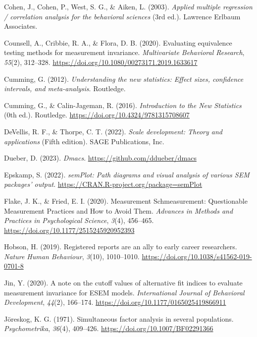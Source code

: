 \documentclass[
  man]{apa7}
\newlength{\cslhangindent}
\newenvironment{CSLReferences}[2] %
 {\begin{list}{}{%
  \setlength{\itemindent}{0pt}
  \setlength{\leftmargin}{0pt}
  \setlength{\parsep}{0pt}
  \ifodd #1
   \setlength{\leftmargin}{\cslhangindent}
   \setlength{\itemindent}{-1\cslhangindent}
  \fi
  \setlength{\itemsep}{#2\baselineskip}}}
 {\end{list}}
\begin{document}
\begin{CSLReferences}{1}{0}
Cohen, J., Cohen, P., West, S. G., \& Aiken, L. (2003). \emph{Applied multiple regression / correlation analysis for the behavioral sciences} (3rd ed.). Lawrence Erlbaum Associates.

Counsell, A., Cribbie, R. A., \& Flora, D. B. (2020). Evaluating equivalence testing methods for measurement invariance. \emph{Multivariate Behavioral Research}, \emph{55}(2), 312--328. \url{https://doi.org/10.1080/00273171.2019.1633617}

Cumming, G. (2012). \emph{Understanding the new statistics: Effect sizes, confidence intervals, and meta-analysis}. Routledge.

Cumming, G., \& Calin-Jageman, R. (2016). \emph{Introduction to the New Statistics} (0th ed.). Routledge. \url{https://doi.org/10.4324/9781315708607}

DeVellis, R. F., \& Thorpe, C. T. (2022). \emph{Scale development: Theory and applications} (Fifth edition). SAGE Publications, Inc.

Dueber, D. (2023). \emph{Dmacs}. \url{https://github.com/ddueber/dmacs}

Epskamp, S. (2022). \emph{semPlot: Path diagrams and visual analysis of various SEM packages' output}. \url{https://CRAN.R-project.org/package=semPlot}

Flake, J. K., \& Fried, E. I. (2020). Measurement Schmeasurement: Questionable Measurement Practices and How to Avoid Them. \emph{Advances in Methods and Practices in Psychological Science}, \emph{3}(4), 456--465. \url{https://doi.org/10.1177/2515245920952393}

Hobson, H. (2019). Registered reports are an ally to early career researchers. \emph{Nature Human Behaviour}, \emph{3}(10), 1010--1010. \url{https://doi.org/10.1038/s41562-019-0701-8}

Jin, Y. (2020). A note on the cutoff values of alternative fit indices to evaluate measurement invariance for ESEM models. \emph{International Journal of Behavioral Development}, \emph{44}(2), 166--174. \url{https://doi.org/10.1177/0165025419866911}

Jöreskog, K. G. (1971). Simultaneous factor analysis in several populations. \emph{Psychometrika}, \emph{36}(4), 409--426. \url{https://doi.org/10.1007/BF02291366}


\end{CSLReferences}
\end{document}
